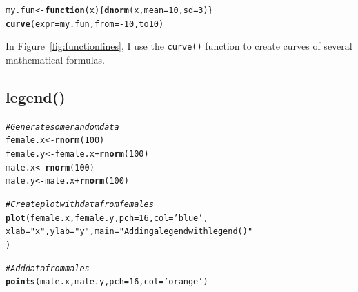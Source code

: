\documentclass{tufte-book}\usepackage[]{graphicx}\usepackage[]{color}
\makeatletter
\newcommand{\hlnum}[1]{\textcolor[rgb]{0.686,0.059,0.569}{#1}}%
\newcommand{\hlstr}[1]{\textcolor[rgb]{0.192,0.494,0.8}{#1}}%
\newcommand{\hlcom}[1]{\textcolor[rgb]{0.678,0.584,0.686}{\textit{#1}}}%
\newcommand{\hlopt}[1]{\textcolor[rgb]{0,0,0}{#1}}%
\newcommand{\hlstd}[1]{\textcolor[rgb]{0.345,0.345,0.345}{#1}}%
\newcommand{\hlkwb}[1]{\textcolor[rgb]{0.69,0.353,0.396}{#1}}%
\newcommand{\hlkwc}[1]{\textcolor[rgb]{0.333,0.667,0.333}{#1}}%
\newcommand{\hlkwd}[1]{\textcolor[rgb]{0.737,0.353,0.396}{\textbf{#1}}}%
\newenvironment{kframe}{%
 \def\at@end@of@kframe{}%
 \ifinner\ifhmode%
  \def\at@end@of@kframe{\end{minipage}}%
  \begin{minipage}{\columnwidth}%
 \fi\fi%
 \def\FrameCommand##1{\hskip\@totalleftmargin \hskip-\fboxsep
 \colorbox{shadecolor}{##1}\hskip-\fboxsep
     \hskip-\linewidth \hskip-\@totalleftmargin \hskip\columnwidth}%
 \MakeFramed {\advance\hsize-\width
   \@totalleftmargin\z@ \linewidth\hsize
   \@setminipage}}%
 {\par\unskip\endMakeFramed%
 \at@end@of@kframe}
\newenvironment{knitrout}{}{} %
\makeatother
\begin{document}
\begin{footnotesize}
\begin{knitrout}
\color{fgcolor}\begin{kframe}
\begin{alltt}
my.fun <- \hlkwd{function}(x) \{\hlkwd{dnorm}(x, mean = 10, sd = 3)\}
\hlkwd{curve}(expr = my.fun, from = -10, to 10)
\end{alltt}
\end{kframe}
\end{knitrout}


In Figure~\ref{fig:functionlines}, I use the \texttt{curve()} function to create curves of several mathematical formulas.


\subsection{legend()}


\begin{marginfigure}
\begin{tiny}
\begin{knitrout}
\color{fgcolor}\begin{kframe}
\begin{alltt}
\hlcom{# Generate some random data}
\hlstd{female.x} \hlkwb{<-} \hlkwd{rnorm}\hlstd{(}\hlnum{100}\hlstd{)}
\hlstd{female.y} \hlkwb{<-} \hlstd{female.x} \hlopt{+} \hlkwd{rnorm}\hlstd{(}\hlnum{100}\hlstd{)}
\hlstd{male.x} \hlkwb{<-} \hlkwd{rnorm}\hlstd{(}\hlnum{100}\hlstd{)}
\hlstd{male.y} \hlkwb{<-} \hlstd{male.x} \hlopt{+} \hlkwd{rnorm}\hlstd{(}\hlnum{100}\hlstd{)}

\hlcom{# Create plot with data from females}
\hlkwd{plot}\hlstd{(female.x, female.y,} \hlkwc{pch} \hlstd{=} \hlnum{16}\hlstd{,} \hlkwc{col} \hlstd{=} \hlstr{'blue'}\hlstd{,}
     \hlkwc{xlab} \hlstd{=} \hlstr{"x"}\hlstd{,} \hlkwc{ylab} \hlstd{=} \hlstr{"y"}\hlstd{,} \hlkwc{main} \hlstd{=} \hlstr{"Adding a legend with legend()"}
     \hlstd{)}

\hlcom{# Add data from males}
\hlkwd{points}\hlstd{(male.x, male.y,} \hlkwc{pch} \hlstd{=} \hlnum{16}\hlstd{,} \hlkwc{col} \hlstd{=} \hlstr{'orange'}\hlstd{)}


\end{alltt}
\end{kframe}
\end{knitrout}
\end{tiny}
\end{marginfigure}
\end{footnotesize}
\end{document}
